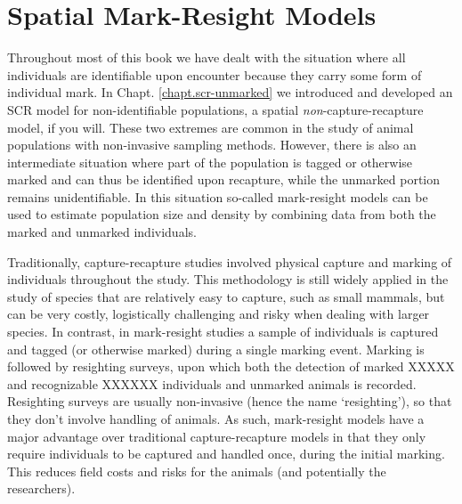 \chapter{
Spatial Mark-Resight Models
}

\label{chapt.partialID}

\vspace{.3in}


Throughout most of this book we have dealt with the situation where
all individuals are identifiable upon encounter because they
carry some form of individual mark. In Chapt. \ref{chapt.scr-unmarked}
we introduced and developed an SCR model for non-identifiable
populations, a spatial {\it non}-capture-recapture model, if you will.
These two extremes are common in the study of animal populations with
non-invasive sampling methods. However, there is also an intermediate
situation where part of the population is tagged or otherwise marked
and can thus be identified upon recapture, while the unmarked portion
remains unidentifiable.  In this situation so-called mark-resight
models \citep{bartmann_etal:1987, arnason_etal:1991, neal_etal:1993}
can be used to estimate population size and density by combining data
from both the marked and unmarked individuals.

Traditionally, capture-recapture studies involved physical capture and
marking of individuals throughout the study.  This methodology is
still widely applied in the study of species that are relatively easy
to capture, such as small mammals, but can be very costly,
logistically challenging and risky when dealing with larger
species. In contrast, in mark-resight studies a sample of individuals
is captured and tagged (or otherwise marked) during a single marking
event. Marking is followed by resighting surveys, upon which both the
detection of marked XXXXX and recognizable XXXXXX individuals and unmarked animals
is recorded. Resighting surveys are usually non-invasive (hence the
name `resighting'), so that they don't involve handling of animals. As
such, mark-resight models have a major advantage over traditional
capture-recapture models in that they only require individuals to be
captured and handled once, during the initial marking. This reduces
field costs and risks for the animals (and potentially the
researchers).

